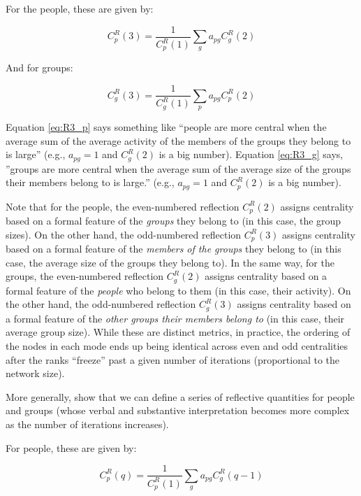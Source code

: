\documentclass[a4paper,fleqn]{cas-sc}
\begin{document}
For the people, these are given by:

\begin{equation}
   C^R_p(3) = \frac{1}{C^R_p(1)}\sum_g a_{pg}C^R_g(2)
   \label{eq:R3_p}
\end{equation}

And for groups:

\begin{equation}
   C^R_g(3) = \frac{1}{C^R_g(1)}\sum_p a_{pg}C^R_p(2)
   \label{eq:R3_g}
\end{equation}

Equation \ref{eq:R3_p} says something like ``people are more central when the average sum of the average activity of the members of the groups they belong to is large'' (e.g., $a_{pg} = 1$ and $C^R_g(2)$ is a big number). Equation \ref{eq:R3_g} says, ''groups are more central when the average sum of the average size of the groups their members belong to is large.'' (e.g., $a_{pg} = 1$ and $C^R_p(2)$ is a big number).

Note that for the people, the even-numbered reflection $C^R_p(2)$ assigns centrality based on a formal feature of the \textit{groups} they belong to (in this case, the group sizes). On the other hand, the odd-numbered reflection $C^R_p(3)$ assigns centrality based on a formal feature of the \textit{members of the groups} they belong to (in this case, the average size of the groups they belong to). In the same way, for the groups, the even-numbered reflection $C^R_g(2)$ assigns centrality based on a formal feature of the \textit{people} who belong to them (in this case, their activity). On the other hand, the odd-numbered reflection $C^R_g(3)$ assigns centrality based on a formal feature of the \textit{other groups their members belong to} (in this case, their average group size). While these are distinct metrics, in practice, the ordering of the nodes in each mode ends up being identical across even and odd centralities after the ranks ``freeze'' past a given number of iterations (proportional to the network size). 

More generally, \citet{hidalgo2009building} show that we can define a series of reflective quantities for people and groups (whose verbal and substantive interpretation becomes more complex as the number of iterations increases). 

For people, these are given by:

\begin{equation}   
    C^R_p(q) = \frac{1}{C^R_p(1)}\sum_g a_{pg}C^R_g(q-1) 
   \label{eq:Rq_p}
\end{equation}
\end{document}
